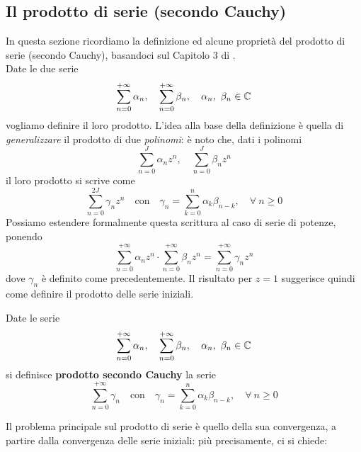 \subsection{Il prodotto di serie (secondo Cauchy)}\label{prodottosecondocauchy}
In questa sezione ricordiamo la definizione ed alcune proprietà del prodotto di serie (secondo Cauchy), basandoci sul Capitolo 3 di \cite{rudin:1976principles}.\\
Date le due serie 
\begin{equation*}
	\sum_{n=0}^{+\infty} \alpha_n,\quad \sum_{n=0}^{+\infty} \beta_n,\quad \alpha_n, \ \beta_n \in \mathbb{C}
\end{equation*}
vogliamo definire il loro prodotto. L'idea alla base della definizione è quella di \textit{generalizzare} il prodotto di due \textit{polinomi}: è noto che, dati i polinomi 
\begin{equation*}
	\sum_{n=0}^{J} \alpha_n z^n,\quad \sum_{n=0}^{J} \beta_n z^n
\end{equation*}
il loro prodotto si scrive come
\begin{equation*}
	\sum_{n=0}^{2J} \gamma_n z^n\quad\text{con}\quad\gamma_n= \sum_{k=0}^{n} \alpha_k\beta_{n-k},\quad \forall \ n\geq 0
\end{equation*}
Possiamo estendere formalmente questa scrittura al caso di serie di potenze, ponendo
\begin{equation*}
	\sum_{n=0}^{+\infty} \alpha_n z^n \cdot \sum_{n=0}^{+\infty} \beta_n z^n = \sum_{n=0}^{+\infty} \gamma_n z^n
\end{equation*}
dove $\gamma_n$ è definito come precedentemente. Il risultato per $z=1$ suggerisce quindi come definire il prodotto delle serie iniziali.
\begin{define}
	Date le serie
	\begin{equation*}
		\sum_{n=0}^{+\infty} \alpha_n,\quad \sum_{n=0}^{+\infty} \beta_n,\quad \alpha_n, \ \beta_n \in \mathbb{C}
	\end{equation*}
si definisce \textbf{prodotto secondo Cauchy} la serie
\begin{equation*}
	\sum_{n=0}^{+\infty} \gamma_n\quad\text{con}\quad\gamma_n= \sum_{k=0}^{n} \alpha_k\beta_{n-k},\quad \forall \ n\geq 0
\end{equation*}
\end{define}
Il problema principale sul prodotto di serie è quello della sua convergenza, a partire dalla convergenza delle serie iniziali: più precisamente, ci si chiede:
